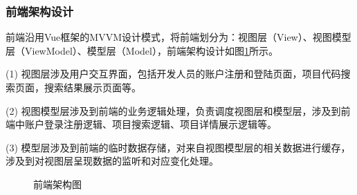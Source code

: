 \documentclass[UTF8,a4paper,12pt]{ctexart}
\numberwithin{equation}{section}
\begin{document}
\subsubsection{前端架构设计}
前端沿用Vue框架的MVVM设计模式，将前端划分为：视图层（View）、视图模型层（ViewModel）、模型层（Model），前端架构设计如图\ref{front_model}所示。\par
(1)	视图层涉及用户交互界面，包括开发人员的账户注册和登陆页面，项目代码搜索页面，搜索结果展示页面等。\par
(2)	视图模型层涉及到前端的业务逻辑处理，负责调度视图层和模型层，涉及到前端中账户登录注册逻辑、项目搜索逻辑、项目详情展示逻辑等。\par
(3)	模型层涉及到前端的临时数据存储，对来自视图模型层的相关数据进行缓存，涉及到对视图层呈现数据的监听和对应变化处理。\par
\begin{figure}[H]
	\caption{前端架构图}
	\label{front_model}
\end{figure}
\end{document}
